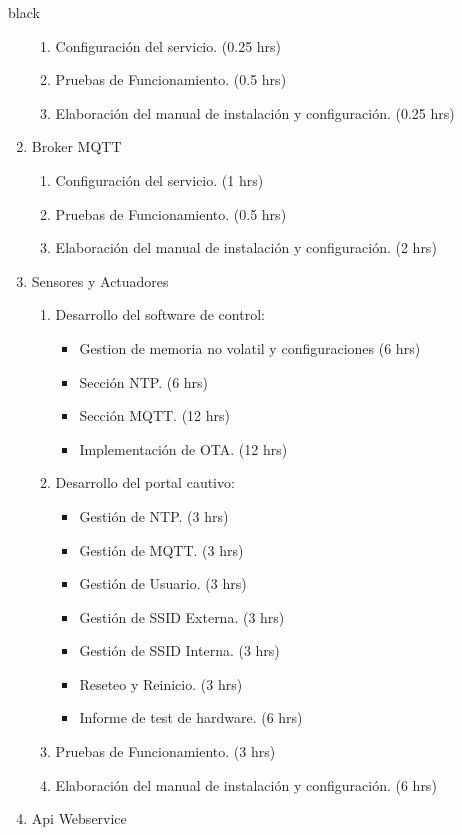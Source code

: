 \documentclass[11pt]{charter}
\begin{document}
\begin{consigna}{black}
\begin{enumerate}
	\begin{enumerate}
		\item Configuración del servicio. (0.25 hrs)
		\item Pruebas de Funcionamiento. (0.5 hrs)
		\item Elaboración del manual de instalación y configuración. (0.25 hrs)
	\end{enumerate}
\item Broker MQTT
	\begin{enumerate}
		\item Configuración del servicio. (1 hrs)
		\item Pruebas de Funcionamiento. (0.5 hrs)
		\item Elaboración del manual de instalación y configuración. (2 hrs)
	\end{enumerate}
\item Sensores y Actuadores
	\begin{enumerate}
		\item Desarrollo del software de control:
		\begin{itemize}
			\item Gestion de memoria no volatil y configuraciones (6 hrs)
			\item Sección NTP. (6 hrs)
			\item Sección MQTT. (12 hrs)
			\item Implementación de OTA. (12 hrs)
		\end{itemize}
		\item Desarrollo del portal cautivo:
		\begin{itemize}
			\item Gestión de NTP. (3 hrs)
			\item Gestión de MQTT. (3 hrs)
			\item Gestión de Usuario. (3 hrs)
			\item Gestión de SSID Externa. (3 hrs)
			\item Gestión de SSID Interna. (3 hrs)
			\item Reseteo y Reinicio. (3 hrs)
			\item Informe de test de hardware. (6 hrs)
		\end{itemize}
		\item Pruebas de Funcionamiento. (3 hrs)
		\item Elaboración del manual de instalación y configuración. (6 hrs)
	\end{enumerate}
\item Api Webservice
	\begin{enumerate}

\end{enumerate}
\end{enumerate}
\end{consigna}
\end{document}
